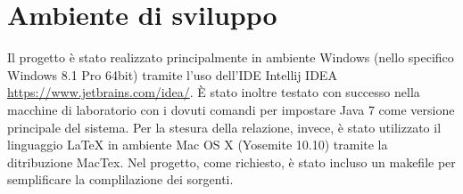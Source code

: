 %
%

\section{Ambiente di sviluppo}
Il progetto \`{e} stato realizzato principalmente in ambiente Windows (nello specifico Windows 8.1 Pro 64bit) tramite l'uso dell'IDE Intellij IDEA \url{https://www.jetbrains.com/idea/}. \`{E} stato inoltre testato con successo nella macchine di laboratorio con i dovuti comandi per impostare Java 7 come versione principale del sistema.
Per la stesura della relazione, invece, \`{e} stato utilizzato il linguaggio \LaTeX{} in ambiente Mac OS X (Yosemite 10.10) tramite la ditribuzione MacTex.
Nel progetto, come richiesto, \`{e} stato incluso un makefile per semplificare la complilazione dei sorgenti. 
